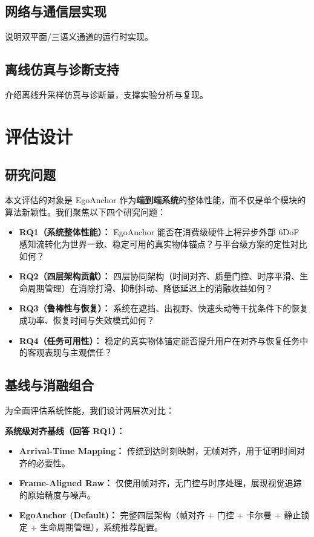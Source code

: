 \documentclass[review]{vgtc}
\begin{document}
\subsection{网络与通信层实现}
说明双平面/三语义通道的运行时实现。

\subsection{离线仿真与诊断支持}
介绍离线升采样仿真与诊断量，支撑实验分析与复现。

\section{评估设计}

\subsection{研究问题}

本文评估的对象是 EgoAnchor 作为\textbf{端到端系统}的整体性能，而不仅是单个模块的算法新颖性。我们聚焦以下四个研究问题：

\begin{itemize}[leftmargin=1.4em]
  \item \textbf{RQ1（系统整体性能）：} EgoAnchor 能否在消费级硬件上将异步外部 6DoF 感知流转化为世界一致、稳定可用的真实物体锚点？与平台级方案的定性对比如何？
  \item \textbf{RQ2（四层架构贡献）：} 四层协同架构（时间对齐、质量门控、时序平滑、生命周期管理）在消除打滑、抑制抖动、降低延迟上的消融收益如何？
  \item \textbf{RQ3（鲁棒性与恢复）：} 系统在遮挡、出视野、快速头动等干扰条件下的恢复成功率、恢复时间与失效模式如何？
  \item \textbf{RQ4（任务可用性）：} 稳定的真实物体锚定能否提升用户在对齐与恢复任务中的客观表现与主观信任？
\end{itemize}

\subsection{基线与消融组合}

为全面评估系统性能，我们设计两层次对比：

\noindent\textbf{系统级对齐基线（回答 RQ1）：}
\begin{itemize}[leftmargin=1.4em]
  \item \textbf{Arrival-Time Mapping：} 传统到达时刻映射，无帧对齐，用于证明时间对齐的必要性。
  \item \textbf{Frame-Aligned Raw：} 仅使用帧对齐，无门控与时序处理，展现视觉追踪的原始精度与噪声。
  \item \textbf{EgoAnchor (Default)：} 完整四层架构（帧对齐 + 门控 + 卡尔曼 + 静止锁定 + 生命周期管理），系统推荐配置。
\end{itemize}
\end{document}
